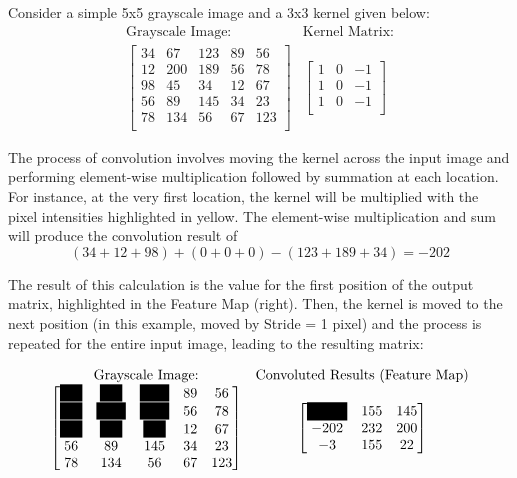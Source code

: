 \noindent Consider a simple 5x5 grayscale image and a 3x3 kernel given below:
\[
\begin{array}{cc}
\text{Grayscale Image:} & \text{Kernel Matrix:} \\
\begin{bmatrix}
    34  &  67  & 123 &  89 &  56 \\
    12  & 200 & 189 &  56 &  78 \\
    98  &  45 &  34 &  12 &  67 \\
    56  &  89 & 145 &  34 &  23 \\
    78  & 134 &  56 &  67 & 123 \\
\end{bmatrix} & 
\begin{bmatrix}
    1 & 0 & -1 \\
    1 & 0 & -1 \\
    1 & 0 & -1 \\
\end{bmatrix}
\end{array}
\]

The process of convolution involves moving the kernel across the input image and performing element-wise multiplication followed by summation at each location. For instance, at the very first location, the kernel will be multiplied with the pixel intensities highlighted in yellow. The element-wise multiplication and sum will produce the convolution result of 
\begin{equation}\label{eqn:convEg}
(34+12+98)+(0+0+0)-(123+189+34) =-202
\end{equation}

The result of this calculation is the value for the first position of the output matrix, highlighted in the Feature Map (right). Then, the kernel is moved to the next position (in this example, moved by Stride = 1 pixel) and the process is repeated for the entire input image, leading to the resulting matrix:

\[
\begin{array}{cc}
\text{Grayscale Image:} & \text{Convoluted Results (Feature Map)} \\
\begin{bmatrix}
    \colorbox{yellow}{$34$}  &  \colorbox{yellow}{$67$}  & \colorbox{yellow}{$123$} &  89 &  56 \\
    \colorbox{yellow}{$12$}  & \colorbox{yellow}{$200$} & \colorbox{yellow}{$189$} &  56 &  78 \\
    \colorbox{yellow}{$98$}  &  \colorbox{yellow}{$45$} &  \colorbox{yellow}{$34$} &  12 &  67 \\
    56  &  89 & 145 &  34 &  23 \\
    78  & 134 &  56 &  67 & 123 \\
\end{bmatrix} & 
\begin{bmatrix}
    \colorbox{yellow}{$-202$} & 155 & 145 \\
    -202 & 232 & 200 \\
    -3 & 155 & 22 \\
\end{bmatrix}
\end{array}
\]

